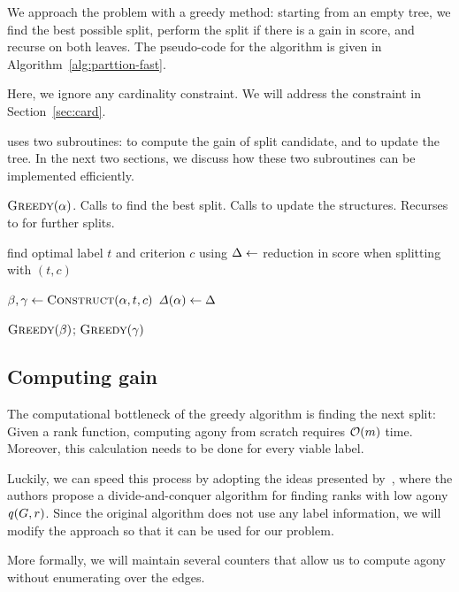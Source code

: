 We approach the problem with a greedy method: starting from an
empty tree, we find the best possible split, perform the split
if there is a gain in score, and recurse on both leaves.
The pseudo-code for the algorithm is given in Algorithm~\ref{alg:parttion-fast}.

Here, we ignore any cardinality constraint. We will address the constraint in Section~\ref{sec:card}.

\algpartition uses two subroutines: \algsplit to compute the gain
of split candidate, and \algleft to update the tree.
In the next two sections, we discuss how these two subroutines
can be implemented efficiently.


\begin{algorithm}[ht!]
\caption{$\textsc{Greedy}(\alpha)$. Calls \algsplit to find the best split. Calls \algleft to update the structures. Recurses to \algpartition for further splits.}
\label{alg:parttion-fast}

find optimal label $t$ and criterion $c$ using \algsplit\;
$\Delta \leftarrow $ reduction in score when splitting with $(t, c)$\;


 {
	
	${\beta,\gamma} \leftarrow \textsc{Construct}(\alpha, t, c)$\;
	$\gain{\alpha} \define \Delta $\;
	
	$\textsc{Greedy}(\beta)$; $\textsc{Greedy}(\gamma)$\;
   
}

\end{algorithm}

\subsection{Computing gain}

The computational bottleneck of the greedy algorithm is finding the next split:
Given a rank function, computing agony from scratch requires $\bigO{m}$ time.
Moreover, this calculation needs to be done for every viable label.

Luckily, we can speed this process by adopting the ideas presented
by~\citet{nikolaj2017tiers}, where the authors propose a divide-and-conquer algorithm
for finding ranks with low agony $\score{G, r}$. Since the original algorithm does not
use any label information, we will modify the approach so that it can be used for our problem.

More formally, we will maintain several counters that allow us to compute
agony without enumerating over the edges.

